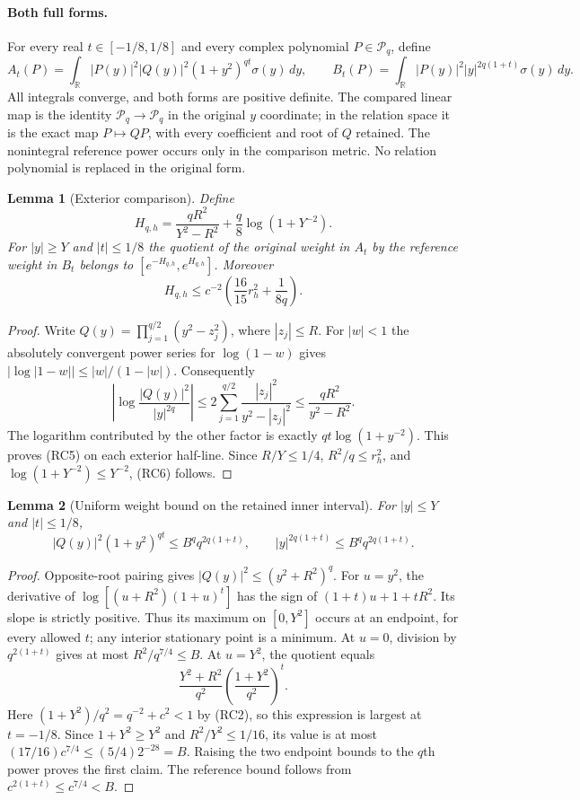 \documentclass[11pt]{article}
\newtheorem{lemma}{Lemma}
\begin{document}
\paragraph{Both full forms.}
For every real $t\in[-1/8,1/8]$ and every complex polynomial
$P\in\mathcal P_q$, define
\[
 A_t(P)=\int_{\mathbb R}|P(y)|^2|Q(y)|^2
                    (1+y^2)^{qt}\sigma(y)\,dy,\qquad
 B_t(P)=\int_{\mathbb R}|P(y)|^2|y|^{2q(1+t)}
                    \sigma(y)\,dy.               \tag{RC4}
\]
All integrals converge, and both forms are positive definite.
The compared linear map is the identity
$\mathcal P_q\longrightarrow\mathcal P_q$ in the original $y$ coordinate;
in the relation space it is the exact map
$P\mapsto QP$, with every coefficient and root of $Q$ retained.
The nonintegral reference power occurs only in the comparison metric.
No relation polynomial is replaced in the original form.

\begin{lemma}[Exterior comparison]
Define
\[
 H_{q,h}=\frac{qR^2}{Y^2-R^2}
                 +\frac q8\log(1+Y^{-2}).         \tag{RC5}
\]
For $|y|\geq Y$ and $|t|\leq1/8$ the quotient of the original weight
in $A_t$ by the reference weight in $B_t$ belongs to
$[e^{-H_{q,h}},e^{H_{q,h}}]$.
Moreover
\[
 H_{q,h}\leq
 c^{-2}\left(\frac{16}{15}r_h^2+\frac1{8q}\right).
 \tag{RC6}
\]
\end{lemma}
\begin{proof}
Write $Q(y)=\prod_{j=1}^{q/2}(y^2-z_j^2)$, where
$|z_j|\leq R$. For $|w|<1$ the absolutely convergent power series for
$\log(1-w)$ gives
$|\log|1-w||\leq |w|/(1-|w|)$.
Consequently
\[
 \left|\log\frac{|Q(y)|^2}{|y|^{2q}}\right|
 \leq 2\sum_{j=1}^{q/2}
       \frac{|z_j|^2}{y^2-|z_j|^2}
 \leq\frac{qR^2}{y^2-R^2}.
\]
The logarithm contributed by the other factor is exactly
$qt\log(1+y^{-2})$.
This proves (RC5) on each exterior half-line.
Since $R/Y\leq1/4$, $R^2/q\leq r_h^2$, and
$\log(1+Y^{-2})\leq Y^{-2}$, (RC6) follows.
\end{proof}

\begin{lemma}[Uniform weight bound on the retained inner interval]
For $|y|\leq Y$ and $|t|\leq1/8$,
\[
 |Q(y)|^2(1+y^2)^{qt}
       \leq B^q q^{2q(1+t)},\qquad
 |y|^{2q(1+t)}
       \leq B^q q^{2q(1+t)}.                     \tag{RC7}
\]
\end{lemma}
\begin{proof}
Opposite-root pairing gives $|Q(y)|^2\leq(y^2+R^2)^q$.
For $u=y^2$, the derivative of
$\log[(u+R^2)(1+u)^t]$ has the sign of
$(1+t)u+1+tR^2$. Its slope is strictly positive.
Thus its maximum on $[0,Y^2]$ occurs at an endpoint, for every allowed
$t$; any interior stationary point is a minimum.
At $u=0$, division by $q^{2(1+t)}$ gives at most
$R^2/q^{7/4}\leq B$.
At $u=Y^2$, the quotient equals
\[
 \frac{Y^2+R^2}{q^2}
              \left(\frac{1+Y^2}{q^2}\right)^t .
\]
Here $(1+Y^2)/q^2=q^{-2}+c^2<1$ by (RC2), so this expression is largest
at $t=-1/8$. Since $1+Y^2\geq Y^2$ and $R^2/Y^2\leq1/16$, its value is
at most $(17/16)c^{7/4}\leq(5/4)2^{-28}=B$.
Raising the two endpoint bounds to the $q$th power proves the first
claim. The reference bound follows from
$c^{2(1+t)}\leq c^{7/4}<B$.
\end{proof}
\end{document}
